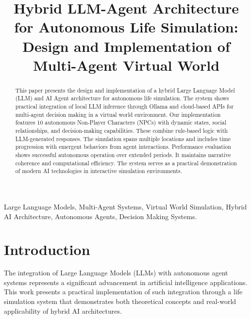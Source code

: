 \documentclass[conference]{IEEEtran}
\begin{document}
\title{Hybrid LLM-Agent Architecture for Autonomous Life Simulation: Design and Implementation of Multi-Agent Virtual World}

\author{
}

\maketitle

\begin{abstract}
This paper presents the design and implementation of a hybrid Large Language Model (LLM) and AI Agent architecture for autonomous life simulation. The system shows practical integration of local LLM inference through Ollama and cloud-based APIs for multi-agent decision making in a virtual world environment. Our implementation features 10 autonomous Non-Player Characters (NPCs) with dynamic states, social relationships, and decision-making capabilities. These combine rule-based logic with LLM-generated responses. The simulation spans multiple locations and includes time progression with emergent behaviors from agent interactions. Performance evaluation shows successful autonomous operation over extended periods. It maintains narrative coherence and computational efficiency. The system serves as a practical demonstration of modern AI technologies in interactive simulation environments.
\end{abstract}

\begin{IEEEkeywords}
Large Language Models, Multi-Agent Systems, Virtual World Simulation, Hybrid AI Architecture, Autonomous Agents, Decision Making Systems.
\end{IEEEkeywords}

\section{Introduction}

The integration of Large Language Models (LLMs) with autonomous agent systems represents a significant advancement in artificial intelligence applications. This work presents a practical implementation of such integration through a life simulation system that demonstrates both theoretical concepts and real-world applicability of hybrid AI architectures.
\end{document}
